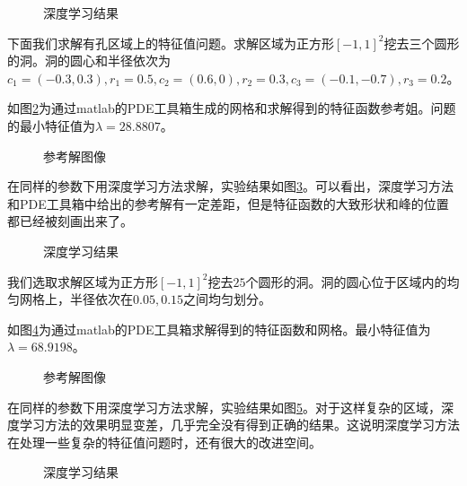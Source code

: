 \begin{figure}[h]
\centering
{}
\caption{深度学习结果}
\label{R1d}
\end{figure}


下面我们求解有孔区域上的特征值问题。求解区域为正方形$[-1,1]^2$挖去三个圆形的洞。洞的圆心和半径依次为
$c_1 = (-0.3, 0.3), r_1 = 0.5, c_2 = (0.6, 0), r_2 = 0.3, c_3 = (-0.1, -0.7), r_3 = 0.2$。

如图\ref{R2r}为通过matlab的PDE工具箱生成的网格和求解得到的特征函数参考姐。问题的最小特征值为$\lambda = 28.8807$。

\begin{figure}[h]
\centering
{}
\caption{参考解图像}
\label{R2r}
\end{figure}

在同样的参数下用深度学习方法求解，实验结果如图\ref{R2d}。可以看出，深度学习方法和PDE工具箱中给出的参考解有一定差距，但是特征函数的大致形状和峰的位置都已经被刻画出来了。

\begin{figure}[h]
\centering
{}
\caption{深度学习结果}
\label{R2d}
\end{figure}


我们选取求解区域为正方形$[-1,1]^2$挖去$25$个圆形的洞。洞的圆心位于区域内的均匀网格上，半径依次在$0.05,0.15$之间均匀划分。

如图\ref{R3r}为通过matlab的PDE工具箱求解得到的特征函数和网格。最小特征值为$\lambda = 68.9198$。

\begin{figure}[h]
\centering
{}
\caption{参考解图像}
\label{R3r}
\end{figure}

在同样的参数下用深度学习方法求解，实验结果如图\ref{R3d}。对于这样复杂的区域，深度学习方法的效果明显变差，几乎完全没有得到正确的结果。这说明深度学习方法在处理一些复杂的特征值问题时，还有很大的改进空间。

\begin{figure}[h]
\centering
{}
\caption{深度学习结果}
\label{R3d}
\end{figure}
